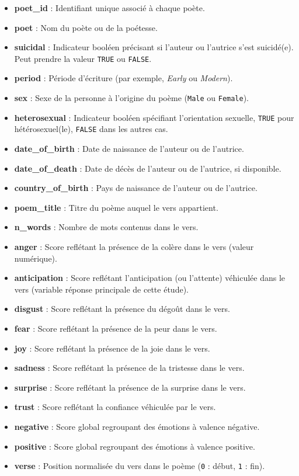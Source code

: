 \documentclass[12pt,a4paper]{article}
\begin{document}
\begin{itemize}
	\item \textbf{poet\_id} : Identifiant unique associé à chaque poète.
	\item \textbf{poet} : Nom du poète ou de la poétesse.
	\item \textbf{suicidal} : Indicateur booléen précisant si l'auteur ou l'autrice
	s'est suicidé(e). Peut prendre la valeur \texttt{TRUE} ou \texttt{FALSE}.
	\item \textbf{period} : Période d'écriture (par exemple, \textit{Early} ou \textit{Modern}).
	\item \textbf{sex} : Sexe de la personne à l'origine du poème (\texttt{Male} ou \texttt{Female}).
	\item \textbf{heterosexual} : Indicateur booléen spécifiant l’orientation sexuelle,
	\texttt{TRUE} pour hétérosexuel(le), \texttt{FALSE} dans les autres cas.
	\item \textbf{date\_of\_birth} : Date de naissance de l'auteur ou de l'autrice.
	\item \textbf{date\_of\_death} : Date de décès de l'auteur ou de l'autrice, si disponible.
	\item \textbf{country\_of\_birth} : Pays de naissance de l'auteur ou de l'autrice.
	\item \textbf{poem\_title} : Titre du poème auquel le vers appartient.
	\item \textbf{n\_words} : Nombre de mots contenus dans le vers.
	\item \textbf{anger} : Score reflétant la présence de la colère dans le vers (valeur numérique).
	\item \textbf{anticipation} : Score reflétant l’anticipation (ou l'attente) véhiculée dans le vers
	(variable réponse principale de cette étude).
	\item \textbf{disgust} : Score reflétant la présence du dégoût dans le vers.
	\item \textbf{fear} : Score reflétant la présence de la peur dans le vers.
	\item \textbf{joy} : Score reflétant la présence de la joie dans le vers.
	\item \textbf{sadness} : Score reflétant la présence de la tristesse dans le vers.
	\item \textbf{surprise} : Score reflétant la présence de la surprise dans le vers.
	\item \textbf{trust} : Score reflétant la confiance véhiculée par le vers.
	\item \textbf{negative} : Score global regroupant des émotions à valence négative.
	\item \textbf{positive} : Score global regroupant des émotions à valence positive.
	\item \textbf{verse} : Position normalisée du vers dans le poème (\texttt{0} : début, \texttt{1} : fin).
\end{itemize}
\end{document}
